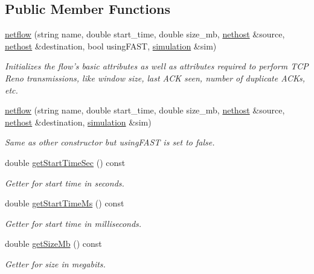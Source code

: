 \subsection*{Public Member Functions}
\begin{DoxyCompactItemize}
\item 
\hyperlink{classnetflow_aefd21ce2f7c362163e51776672e1ebeb}{netflow} (string name, double start\-\_\-time, double size\-\_\-mb, \hyperlink{classnethost}{nethost} \&source, \hyperlink{classnethost}{nethost} \&destination, bool using\-F\-A\-S\-T, \hyperlink{classsimulation}{simulation} \&sim)
\begin{DoxyCompactList}\small\item\em Initializes the flow's basic attributes as well as attributes required to perform T\-C\-P Reno transmissions, like window size, last A\-C\-K seen, number of duplicate A\-C\-Ks, etc. \end{DoxyCompactList}\item 
\hyperlink{classnetflow_ac64edff00ca0ff62217243ce8abb94e6}{netflow} (string name, double start\-\_\-time, double size\-\_\-mb, \hyperlink{classnethost}{nethost} \&source, \hyperlink{classnethost}{nethost} \&destination, \hyperlink{classsimulation}{simulation} \&sim)
\begin{DoxyCompactList}\small\item\em Same as other constructor but {\ttfamily using\-F\-A\-S\-T} is set to false. \end{DoxyCompactList}\item 
double \hyperlink{classnetflow_a6c89dfa31291104fd5207f10a4bb424b}{get\-Start\-Time\-Sec} () const 
\begin{DoxyCompactList}\small\item\em Getter for start time in seconds. \end{DoxyCompactList}\item 
double \hyperlink{classnetflow_a4ca3539d49814e6ffaf46c9db28d4cb1}{get\-Start\-Time\-Ms} () const 
\begin{DoxyCompactList}\small\item\em Getter for start time in milliseconds. \end{DoxyCompactList}\item 
double \hyperlink{classnetflow_a8afb866e40738f7038d18bdb9a572500}{get\-Size\-Mb} () const 
\begin{DoxyCompactList}\small\item\em Getter for size in megabits. \end{DoxyCompactList}\item 

\end{DoxyCompactItemize}
